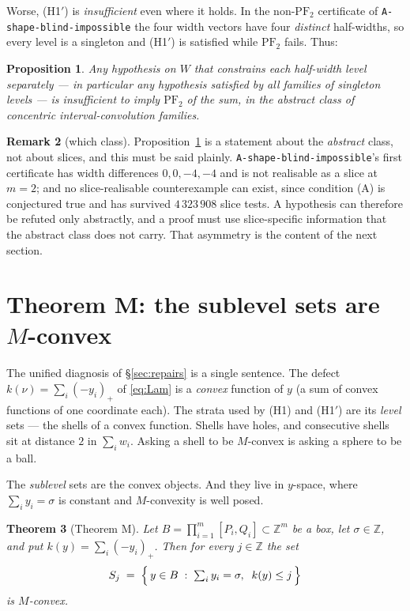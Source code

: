 \documentclass[11pt]{article}
\theoremstyle{plain}
\newtheorem{theorem}{Theorem}
\newtheorem{proposition}[theorem]{Proposition}
\theoremstyle{definition}
\newtheorem{remark}[theorem]{Remark}
\newcommand{\PFtwo}{\mathrm{PF}_2}
\newcommand{\Z}{\mathbb{Z}}
\newcommand{\pospart}[1]{\left(#1\right)_{+}}
\begin{document}
Worse, (H1$'$) is \emph{insufficient} even where it holds. In the non-$\PFtwo$ certificate
of \texttt{A-shape-blind-impossible} the four width vectors have four \emph{distinct}
half-widths, so every level is a singleton and (H1$'$) is satisfied while $\PFtwo$ fails.
Thus:

\begin{proposition}\label{prop:levelwise}
Any hypothesis on $W$ that constrains each half-width level separately --- in particular
any hypothesis satisfied by all families of singleton levels --- is insufficient to imply
$\PFtwo$ of the sum, in the abstract class of concentric interval-convolution families.
\end{proposition}

\begin{remark}[which class]\label{rem:class}
Proposition~\ref{prop:levelwise} is a statement about the \emph{abstract} class, not about
slices, and this must be said plainly. \texttt{A-shape-blind-impossible}'s first
certificate has width differences $0,0,-4,-4$ and is not realisable as a slice at $m=2$;
and no slice-realisable counterexample can exist, since condition (A) is conjectured true
and has survived $4\,323\,908$ slice tests. A hypothesis can therefore be refuted only
abstractly, and a proof must use slice-specific information that the abstract class does
not carry. That asymmetry is the content of the next section.
\end{remark}

\section{Theorem M: the sublevel sets are $M$-convex}\label{sec:M}

The unified diagnosis of \S\ref{sec:repairs} is a single sentence. The defect
$k(\nu)=\sum_i\pospart{-y_i}$ of \eqref{eq:Lam} is a \emph{convex} function of $y$ (a sum
of convex functions of one coordinate each). The strata used by (H1) and (H1$'$) are its
\emph{level} sets --- the shells of a convex function. Shells have holes, and consecutive
shells sit at distance $2$ in $\sum_i w_i$. Asking a shell to be $M$-convex is asking a
sphere to be a ball.

The \emph{sublevel} sets are the convex objects. And they live in $y$-space, where
$\sum_i y_i=\sigma$ is constant and $M$-convexity is well posed.

\begin{theorem}[Theorem M]\label{thm:M}
Let $B=\prod_{i=1}^m[P_i,Q_i]\subset\Z^m$ be a box, let $\sigma\in\Z$, and put
$k(y)=\sum_{i}\pospart{-y_i}$. Then for every $j\in\Z$ the set
\[
   S_j\;=\;\Bigl\{\,y\in B\;:\;\textstyle\sum_i y_i=\sigma,\;\; k(y)\le j\,\Bigr\}
\]
is $M$-convex.
\end{theorem}
\end{document}
